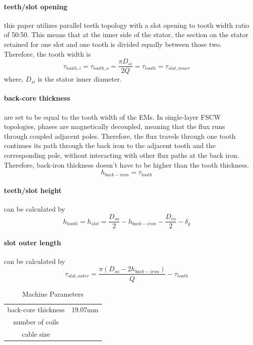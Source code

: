 \documentclass [a4 paper, 11pt, titlepage] {article}
\begin{document}
	\paragraph{teeth/slot opening} this paper utilizes parallel teeth topology with a slot opening to tooth width ratio of 50:50. This means that at the inner side of the stator, the section on the stator retained for one slot and one tooth is divided equally between those two. Therefore, the tooth width is
	\begin{equation}
		\tau_{tooth,i}=\tau_{tooth,o}=\frac{\pi D_{si}}{2Q}=\tau_{tooth}=\tau_{slot,inner}
	\end{equation}
	where, $D_{si}$ is the stator inner diameter.
	
	\paragraph{back-core thickness} are set to be equal to the tooth width of the EMs. In single-layer FSCW topologies, phases are magnetically decoupled, meaning that the flux runs through coupled adjacent poles. Therefore, the flux travels through one tooth continues its path through the back iron to the adjacent tooth and the corresponding pole, without interacting with other flux paths at the back iron. Therefore, back-iron thickness doesn't have to be higher than the tooth thickness. 
	\begin{equation}
		h_{back-iron}=\tau_{tooth}
	\end{equation}

	\paragraph{teeth/slot height} can be calculated by
	\begin{equation}
		h_{tooth}=h_{slot}=\frac{D_{so}}{2}-h_{back-iron}-\frac{D_{ro}}{2}-\delta_g
	\end{equation}
	
	\paragraph{slot outer length} can be calculated by
	\begin{equation}
		\tau_{slot,outer}=\frac{\pi (D_{so}-2h_{back-iron})}{Q}-\tau_{tooth}
	\end{equation}
	
		\begin{table}[h]
		\begin{center}
			\begin{tabular}{c|c}
				 &  \\
				\hline
				back-core thickness & 19.07mm \\
				number of coils & \\
				cable size & 
			\end{tabular}
		\end{center}
		\caption{Machine Parameters}
		\label{tab:machineParameters}
	\end{table}
	
\end{document}
